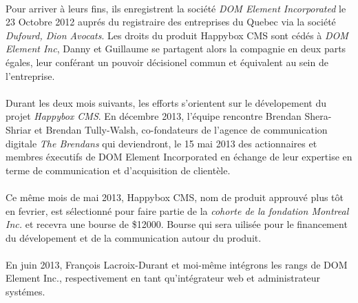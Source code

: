 \documentclass[11pt, a4paper ]{article}
\begin{document}
\paragraph{}
Pour arriver à leurs fins, ils enregistrent la société \emph{DOM Element Incorporated} le 23 Octobre 2012 auprés du registraire des entreprises du Quebec via la société \emph{Dufourd, Dion Avocats}. Les droits du produit Happybox CMS sont cédés à \emph{DOM Element Inc}, Danny et Guillaume se partagent alors la compagnie en deux parts égales, leur conférant un pouvoir décisionel commun et équivalent au sein de l'entreprise.

\paragraph{}
Durant les deux mois suivants, les efforts s'orientent sur le dévelopement du projet \emph{Happybox CMS}.
En décembre 2013, l'équipe rencontre Brendan Shera-Shriar et Brendan Tully-Walsh, co-fondateurs de l'agence de communication digitale \emph{The Brendans} qui deviendront, le 15 mai 2013 des actionnaires et membres éxecutifs de DOM Element Incorporated en échange de leur expertise en terme de communication et d'acquisition de clientèle.

\paragraph{}
Ce même mois de mai 2013, Happybox CMS, nom de produit approuvé plus tôt en fevrier, est sélectionné pour faire partie de la \emph{cohorte de la fondation Montreal Inc.} et recevra une bourse de \$12000. Bourse qui sera uilisée pour le financement du dévelopement et de la communication autour du produit.


\paragraph{}
En juin 2013, François Lacroix-Durant et moi-même intégrons les rangs de DOM Element Inc., respectivement en tant qu'intégrateur web et administrateur systémes.

\paragraph{} %
\end{document}
